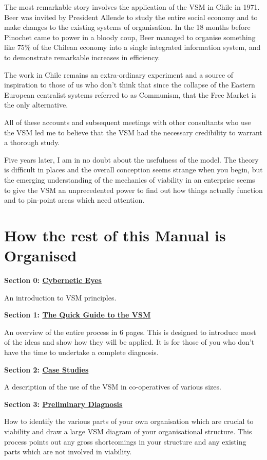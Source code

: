 The most remarkable story involves the application of the VSM in Chile in 1971. Beer was invited by President Allende to study the entire social economy and to make changes to the existing systems of organisation. In the 18 months before Pinochet came to power in a bloody coup, Beer managed to organise something like 75\% of the Chilean economy into a single integrated information system, and to demonstrate remarkable increases in efficiency.

The work in Chile remains an extra-ordinary experiment and a source of inspiration to those of us who don't think that since the collapse of the Eastern European centralist systems referred to as Communism, that the Free Market is the only alternative.

All of these accounts and subsequent meetings with other consultants who use the VSM led me to believe that the VSM had the necessary credibility to warrant a thorough study.

Five years later, I am in no doubt about the usefulness of the model. The theory is difficult in places and the overall conception seems strange when you begin, but the emerging understanding of the mechanics of viability in an enterprise seems to give the VSM an unprecedented power to find out how things actually function and to pin-point areas which need attention.

\section*{How the rest of this Manual is Organised}
\textbf{Section 0: \hyperref[CYBERNETIC EYES]{Cybernetic Eyes}}

An introduction to VSM principles.

\textbf{Section 1: \hyperref[THE QUICK GUIDE TO THE VSM]{The Quick Guide to the VSM}}

An overview of the entire process in 6 pages. This is designed to introduce most of the ideas and show how they will be applied. It is for those of you who don't have the time to undertake a complete diagnosis.

\textbf{Section 2: \hyperref[CASE STUDIES]{Case Studies}}

A description of the use of the VSM in co-operatives of various sizes.

\textbf{Section 3: \hyperref[PRELIMINARY DIAGNOSIS]{Preliminary Diagnosis}}

How to identify the various parts of your own organisation which are crucial to viability and draw a large VSM diagram of your organisational structure. This process points out any gross shortcomings in your structure and any existing parts which are not involved in viability.

